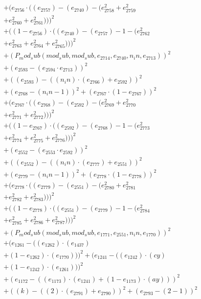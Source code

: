 \documentclass[10pt, a4paper]{article}
\begin{document}
\begin{small}
\begin{align*}
& + (e_{2756}  \cdot  ((e_{2757}) - (e_{2740}) - (e_{2758}^{2} + e_{2759}^{2} \\
& + e_{2760}^{2} + e_{2761}^{2})))^{2} \\
& + ((1 - e_{2756})  \cdot  ((e_{2740}) - (e_{2757}) - 1 - (e_{2762}^{2} \\
& + e_{2763}^{2} + e_{2764}^{2} + e_{2765}^{2})))^{2} \\
& + (P_mod_sub(mod_sub, mod_sub, e_{2714}, e_{2740}, n_in, e_{2713}))^{2} \\
& + (e_{2593} - (e_{2594}  \cdot  e_{2713}))^{2} \\
& + ((e_{2593}) - ((n_in)  \cdot  (e_{2766}) + e_{2592}))^{2} \\
& + (e_{2768} - (n_in - 1))^{2} + (e_{2767}  \cdot  (1 - e_{2767}))^{2} \\
& + (e_{2767}  \cdot  ((e_{2768}) - (e_{2592}) - (e_{2769}^{2} + e_{2770}^{2} \\
& + e_{2771}^{2} + e_{2772}^{2})))^{2} \\
& + ((1 - e_{2767})  \cdot  ((e_{2592}) - (e_{2768}) - 1 - (e_{2773}^{2} \\
& + e_{2774}^{2} + e_{2775}^{2} + e_{2776}^{2})))^{2} \\
& + (e_{2552} - (e_{2553}  \cdot  e_{2592}))^{2} \\
& + ((e_{2552}) - ((n_in)  \cdot  (e_{2777}) + e_{2551}))^{2} \\
& + (e_{2779} - (n_in - 1))^{2} + (e_{2778}  \cdot  (1 - e_{2778}))^{2} \\
& + (e_{2778}  \cdot  ((e_{2779}) - (e_{2551}) - (e_{2780}^{2} + e_{2781}^{2} \\
& + e_{2782}^{2} + e_{2783}^{2})))^{2} \\
& + ((1 - e_{2778})  \cdot  ((e_{2551}) - (e_{2779}) - 1 - (e_{2784}^{2} \\
& + e_{2785}^{2} + e_{2786}^{2} + e_{2787}^{2})))^{2} \\
& + (P_mod_sub(mod_sub, mod_sub, e_{1771}, e_{2551}, n_in, e_{1770}))^{2} \\
& + (e_{1261} - ((e_{1262})  \cdot  (e_{1437}) \\
& + (1 - e_{1262})  \cdot  (e_{1770})))^{2} + (e_{1241} - ((e_{1242})  \cdot  (cy) \\
& + (1 - e_{1242})  \cdot  (e_{1261})))^{2} \\
& + (e_{1172} - ((e_{1173})  \cdot  (e_{1241}) + (1 - e_{1173})  \cdot  (ay)))^{2} \\
& + ((k) - ((2)  \cdot  (e_{2791}) + e_{2790}))^{2} + (e_{2793} - (2 - 1))^{2} \\

\end{align*}
\end{small}
\end{document}
